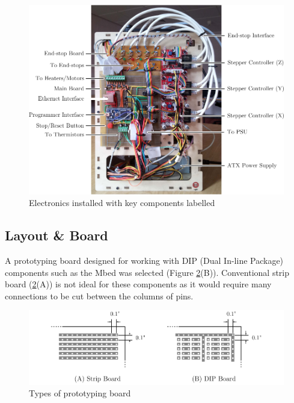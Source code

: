		\begin{figure}
			\includegraphics[width=1\textwidth]{diagrams/electronicsPhoto.pdf}
			\caption{Electronics installed with key components labelled}
			\label{fig:electronicsPhoto}
		\end{figure}
		
		\subsection{Layout \& Board}
			
			A prototyping board designed for working with DIP (Dual In-line Package)
			components such as the Mbed was selected (Figure \ref{fig:dipBoard}(B)).
			Conventional strip board (\ref{fig:dipBoard}(A)) is not ideal for these
			components as it would require many connections to be cut between the
			columns of pins. 
			
			\begin{figure}
				\includegraphics[width=1\textwidth]{diagrams/dipBoard.pdf}
				\caption{Types of prototyping board}
				\label{fig:dipBoard}
			\end{figure}
			
